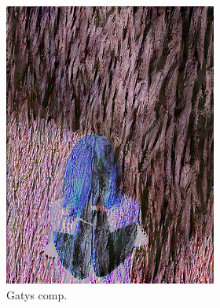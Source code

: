 \begin{figure}[]
\begin{subfigure}{\textwidth}
\begin{subfigure}{0.24\textwidth}
            \includegraphics[width=\textwidth]{images/04-experiment02/human/wood/gatys_im.jpg}
            \caption*{Gatys comp.}
        \end{subfigure}
        \hfill
        \begin{subfigure}{0.24\textwidth}
            \centering

\end{subfigure}
\end{subfigure}
\end{figure}
